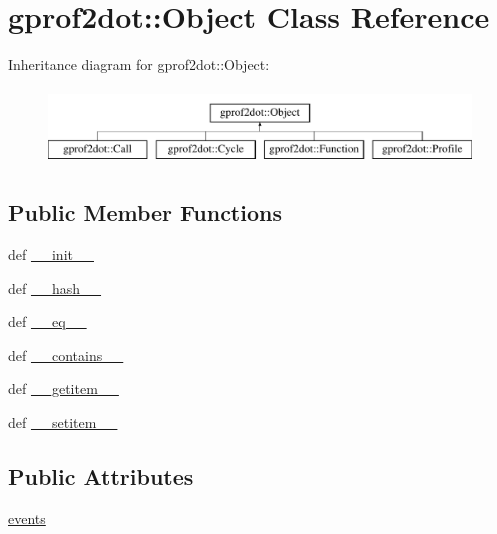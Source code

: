 \hypertarget{classgprof2dot_1_1Object}{
\section{gprof2dot::Object Class Reference}
\label{classgprof2dot_1_1Object}
}
Inheritance diagram for gprof2dot::Object:\begin{figure}[H]
\begin{center}
\leavevmode
\includegraphics[height=2.000000cm]{classgprof2dot_1_1Object}
\end{center}
\end{figure}
\subsection*{Public Member Functions}
\begin{DoxyCompactItemize}
\item 
def \hyperlink{classgprof2dot_1_1Object_ae98eed8f428fdb899a83c5a659346c33}{\_\-\_\-init\_\-\_\-}
\item 
def \hyperlink{classgprof2dot_1_1Object_adbca16d1a1ee8ff2140e50f82fdd2485}{\_\-\_\-hash\_\-\_\-}
\item 
def \hyperlink{classgprof2dot_1_1Object_a7ff283c9ac1d0c8ab98d0c62a9e0c67d}{\_\-\_\-eq\_\-\_\-}
\item 
def \hyperlink{classgprof2dot_1_1Object_a3b944e8524a6ea4ea23eee28ad7e98d7}{\_\-\_\-contains\_\-\_\-}
\item 
def \hyperlink{classgprof2dot_1_1Object_a81b2078fb11399a1ae037aec45057167}{\_\-\_\-getitem\_\-\_\-}
\item 
def \hyperlink{classgprof2dot_1_1Object_a95da8c2aa46bb546fff598a3b2212ec3}{\_\-\_\-setitem\_\-\_\-}
\end{DoxyCompactItemize}
\subsection*{Public Attributes}
\begin{DoxyCompactItemize}
\item 
\hyperlink{classgprof2dot_1_1Object_a1361aa2a606f34d26b43fb87e0468680}{events}
\end{DoxyCompactItemize}


